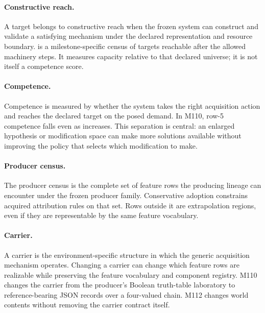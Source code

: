 \paragraph{Constructive reach.} A target belongs to constructive reach when the frozen system can construct and validate a satisfying mechanism under the declared representation and resource boundary. \reach is a milestone-specific census of targets reachable after the allowed machinery steps. It measures capacity relative to that declared universe; it is not itself a competence score.

\paragraph{Competence.} Competence is measured by whether the system takes the right acquisition action and reaches the declared target on the posed demand. In M110, row-5 competence falls even as \reach increases. This separation is central: an enlarged hypothesis or modification space can make more solutions available without improving the policy that selects which modification to make.

\paragraph{Producer census.} The producer census is the complete set of feature rows the producing lineage can encounter under the frozen producer family. Conservative adoption constrains acquired attribution rules on that set. Rows outside it are extrapolation regions, even if they are representable by the same feature vocabulary.

\paragraph{Carrier.} A carrier is the environment-specific structure in which the generic acquisition mechanism operates. Changing a carrier can change which feature rows are realizable while preserving the feature vocabulary and component registry. M110 changes the carrier from the producer's Boolean truth-table laboratory to reference-bearing JSON records over a four-valued chain. M112 changes world contents without removing the carrier contract itself.

